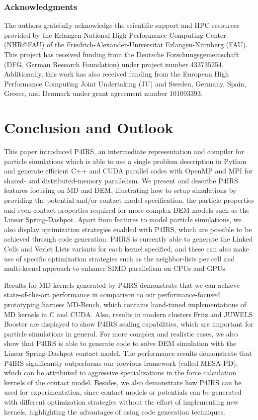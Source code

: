 \documentclass[Afour,sageh,times]{sagej}
\newcommand{\RMchange}[1]{{\color{blue} #1}}
\begin{document}
\subsubsection*{Acknowledgments}

The authors gratefully acknowledge the scientific support and HPC resources provided by the Erlangen National High Performance Computing Center (NHR@FAU) of the Friedrich-Alexander-Universität Erlangen-Nürnberg (FAU).
This project has received funding from the Deutsche Forschungsgemeinschaft (DFG, German Research Foundation) under project number 433735254.
\RMchange{Additionally, this work has also received funding from the European High Performance Computing Joint Undertaking (JU) and Sweden, Germany, Spain, Greece, and Denmark under grant agreement number 101093393.}

\section{Conclusion and Outlook}
\label{sec:conclusion}

This paper introduced P4IRS, an intermediate representation and compiler for particle simulations which is able to use a single problem description in Python and generate efficient C++ and CUDA parallel codes with OpenMP and MPI for shared- and distributed-memory parallelism.
We present and describe P4IRS features focusing on \ac{MD} and \ac{DEM}, illustrating how to setup simulations by providing the potential and/or contact model specification, the particle properties and even contact properties required for more complex DEM models such as the Linear Spring-Dashpot.
Apart from features to model particle simulations, we also display optimization strategies enabled with P4IRS, which are possible to be achieved through code generation.
P4IRS is currently able to generate the Linked Cells and Verlet Lists variants for each kernel specified, and these can also make use of specific optimization strategies such as the neighbor-lists per cell and multi-kernel approach to enhance SIMD parallelism on CPUs and GPUs.

Results for \ac{MD} kernels generated by P4IRS demonstrate that we can achieve state-of-the-art performance in comparison to our performance-focused prototyping harness MD-Bench, which contains hand-tuned implementations of \ac{MD} kernels in C and CUDA.
Also, results in modern clusters Fritz and JUWELS Booster are displayed to show P4IRS scaling capabilities, which are important for particle simulations in general.
For more complex and realistic cases, we also show that P4IRS is able to generate code to solve \ac{DEM} simulation with the Linear Spring-Dashpot contact model.
The performance results demonstrate that P4IRS significantly outperforms our previous framework (called MESA-PD), which can be attributed to aggressive specializations in the force calculation kernels of the contact model.
Besides, we also demonstrate how P4IRS can be used for experimentation, since contact models or potentials can be generated with different optimization strategies without the effort of implementing new kernels, highlighting the advantages of using code generation techniques.
\end{document}
